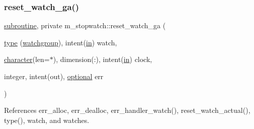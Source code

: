 \subsubsection{\texorpdfstring{reset\+\_\+watch\+\_\+ga()}{reset\_watch\_ga()}}
{\footnotesize\ttfamily \hyperlink{M__stopwatch_83_8txt_acfbcff50169d691ff02d4a123ed70482}{subroutine}, private m\+\_\+stopwatch\+::reset\+\_\+watch\+\_\+ga (\begin{DoxyParamCaption}\item[{\hyperlink{stop__watch_83_8txt_a70f0ead91c32e25323c03265aa302c1c}{type} (\hyperlink{structm__stopwatch_1_1watchgroup}{watchgroup}), intent(\hyperlink{M__journal_83_8txt_afce72651d1eed785a2132bee863b2f38}{in})}]{watch,  }\item[{\hyperlink{option__stopwatch_83_8txt_abd4b21fbbd175834027b5224bfe97e66}{character}(len=$\ast$), dimension(\+:), intent(\hyperlink{M__journal_83_8txt_afce72651d1eed785a2132bee863b2f38}{in})}]{clock,  }\item[{integer, intent(out), \hyperlink{option__stopwatch_83_8txt_aa4ece75e7acf58a4843f70fe18c3ade5}{optional}}]{err }\end{DoxyParamCaption})\hspace{0.3cm}{\ttfamily [private]}}



References err\+\_\+alloc, err\+\_\+dealloc, err\+\_\+handler\+\_\+watch(), reset\+\_\+watch\+\_\+actual(), type(), watch, and watches.

